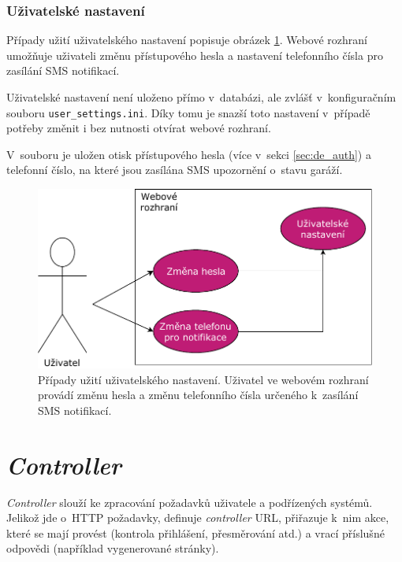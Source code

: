 \subsubsection{Uživatelské nastavení}
\label{sec:de_user_settings}

Případy užití uživatelského nastavení popisuje obrázek \ref{fig:use_case_user}. Webové rozhraní umožňuje uživateli změnu přístupového hesla a nastavení telefonního čísla pro zasílání SMS notifikací.

Uživatelské nastavení není uloženo přímo v~databázi, ale zvlášť v~konfiguračním souboru \texttt{user\_settings.ini}. Díky tomu je snazší toto nastavení v~případě potřeby změnit i bez nutnosti otvírat webové rozhraní.

V~souboru je uložen otisk přístupového hesla (více v~sekci \ref{sec:de_auth}) a telefonní číslo, na které jsou zasílána SMS upozornění o~stavu garáží.

\begin{figure}[h!]
    \centering
    \includegraphics[width=\textwidth]{images/use_case_user.pdf}
    \caption[Případy užití uživatelského nastavení]{Případy užití uživatelského nastavení. Uživatel ve webovém rozhraní provádí změnu hesla a změnu telefonního čísla určeného k~zasílání SMS notifikací.}
    \label{fig:use_case_user}
\end{figure}


\section{\textit{Controller}}
\label{sec:de_controller}

\textit{Controller} slouží ke zpracování požadavků uživatele a podřízených systémů. Jelikož jde o~HTTP požadavky, definuje \textit{controller} URL, přiřazuje k~nim akce, které se mají provést (kontrola přihlášení, přesměrování atd.) a vrací příslušné odpovědi (například vygenerované stránky).

